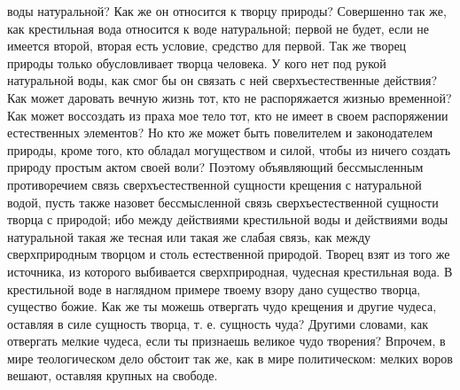 \documentclass[12pt,oneside]{book}
\begin{document}
воды натуральной? Как же он относится к творцу природы? Совершенно так же, как крестильная вода относится к воде натуральной; первой не будет, если не имеется второй, вторая есть условие, средство для первой. Так же творец природы только обусловливает творца человека. У кого нет под рукой натуральной воды, как смог бы он связать с ней сверхъестественные действия? Как может даровать вечную жизнь тот, кто не распоряжается жизнью временной? Как может воссоздать из праха мое тело тот, кто не имеет в своем распоряжении естественных элементов? Но кто же может быть повелителем и законодателем природы, кроме того, кто обладал могуществом и силой, чтобы из ничего создать природу простым актом своей воли? Поэтому объявляющий бессмысленным противоречием связь сверхъестественной сущности крещения с натуральной водой, пусть также назовет бессмысленной связь сверхъестественной сущности творца с природой; ибо между действиями крестильной воды и действиями воды натуральной такая же тесная или такая же слабая связь, как между сверхприродным творцом и столь естественной природой. Творец взят из того же источника, из которого выбивается сверхприродная, чудесная крестильная вода. В крестильной воде в наглядном примере твоему взору дано существо творца, существо божие. Как же ты можешь отвергать чудо крещения и другие чудеса, оставляя в силе сущность творца, т. е. сущность чуда? Другими словами, как отвергать мелкие чудеса, если ты признаешь великое чудо творения? Впрочем, в мире теологическом дело обстоит так же, как в мире политическом: мелких воров вешают, оставляя крупных на свободе.



\chapter{}
\end{document}
